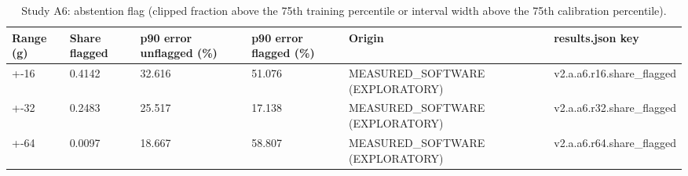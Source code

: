 \begin{table}[t]
\centering
\small
\caption{Study A6: abstention flag (clipped fraction above the 75th training percentile or interval width above the 75th calibration percentile).}
\label{tab:v2_tab_abstention}
\begin{tabular}{llllll}
\toprule
Range (g) & Share flagged & p90 error unflagged (\%) & p90 error flagged (\%) & Origin & results.json key \\
\midrule
+-16 & 0.4142 & 32.616 & 51.076 & MEASURED\_SOFTWARE (EXPLORATORY) & v2.a.a6.r16.share\_flagged \\
+-32 & 0.2483 & 25.517 & 17.138 & MEASURED\_SOFTWARE (EXPLORATORY) & v2.a.a6.r32.share\_flagged \\
+-64 & 0.0097 & 18.667 & 58.807 & MEASURED\_SOFTWARE (EXPLORATORY) & v2.a.a6.r64.share\_flagged \\
\bottomrule
\end{tabular}
\end{table}
